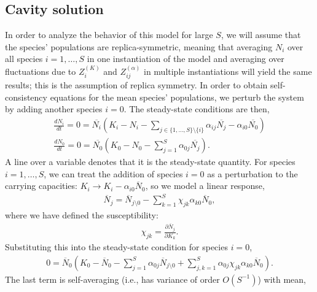 \documentclass[10pt]{article}
\begin{document}
\subsection{Cavity solution}

In order to analyze the behavior of this model for large $S$, we will assume that the species' populations are replica-symmetric, meaning that averaging $N_i$ over all species $i = 1,\dots,S$ in one instantiation of the model and averaging over fluctuations due to $Z_i^{(K)}$ and $Z_{ij}^{(\alpha)}$ in multiple instantiations will yield the same results; this is the assumption of replica symmetry.
In order to obtain self-consistency equations for the mean species' populations, we perturb the system by adding another species $i = 0$.
The steady-state conditions are then,
\begin{gather}
	\frac{dN_i}{dt}
	=
	0
	=
	\overline{N_i}
	\left(
		K_i
		-
		N_i
		-
		\sum_{j \in \{1,\dots,S\} \setminus \{i\}}
		\alpha_{ij} \overline{N_j}
		-
		\alpha_{i0} \overline{N_0}
	\right)
	\\
	\frac{dN_0}{dt}
	=
	0
	=
	\overline{N_0}
	\left(
		K_0
		-
		N_0
		-
		\sum_{j=1}^S
		\alpha_{0j} \overline{N_j}
	\right).
\end{gather}
A line over a variable denotes that it is the steady-state quantity.
For species $i = 1,\dots,S$, we can treat the addition of species $i = 0$ as a perturbation to the carrying capacities: $K_i \to K_i - \alpha_{i0} \overline{N}_0$, so we model a linear response,
\begin{align}
	\overline{N}_j
	=
	\overline{N}_{j \setminus 0}
	-
	\sum_{k = 1}^S
	\chi_{jk}
	\alpha_{k0} \overline{N}_0,
\end{align}
where we have defined the susceptibility:
\begin{align}
	\chi_{jk}
	=
	\frac{\partial \overline{N}_j}{\partial K_k}.
\end{align}
Substituting this into the steady-state condition for species $i = 0$,
\begin{align}
	0 = \overline{N}_0
	\left(
		K_0
		-
		\overline N_0
		-
		\sum_{j=1}^S
		\alpha_{0j} 
		\overline{N}_{j \setminus 0}
		+
		\sum_{j,k=1}^S
		\alpha_{0j} \chi_{jk} \alpha_{k0} \overline{N}_0
	\right).
\end{align}
The last term is self-averaging (i.e., has variance of order $O(S^{-1})$) with mean,
\end{document}
